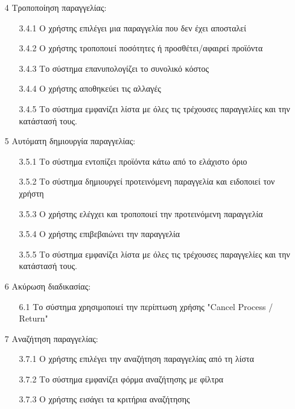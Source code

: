 \documentclass[12pt,a4paper,twoside]{book}
\begin{document}
\begin{enumerate}
\begin{enumerate}
        \end{enumerate}
  \item[4 ] Τροποποίηση παραγγελίας:
        \begin{enumerate}
          \item[3.4.1 ] Ο χρήστης επιλέγει μια παραγγελία που δεν έχει αποσταλεί %
          \item[3.4.2 ] Ο χρήστης τροποποιεί ποσότητες ή προσθέτει/αφαιρεί προϊόντα
          \item[3.4.3 ] Το σύστημα επανυπολογίζει το συνολικό κόστος
          \item[3.4.4 ] Ο χρήστης αποθηκεύει τις αλλαγές
          \item[3.4.5 ] Το σύστημα εμφανίζει λίστα με όλες τις τρέχουσες παραγγελίες και την κατάστασή τους.
        \end{enumerate}
  \item[5 ] Αυτόματη δημιουργία παραγγελίας: %
        \begin{enumerate}
          \item[3.5.1 ] Το σύστημα εντοπίζει προϊόντα κάτω από το ελάχιστο όριο
          \item[3.5.2 ] Το σύστημα δημιουργεί προτεινόμενη παραγγελία και ειδοποιεί τον χρήστη %
          \item[3.5.3 ] Ο χρήστης ελέγχει και τροποποιεί την προτεινόμενη παραγγελία
          \item[3.5.4 ] Ο χρήστης επιβεβαιώνει την παραγγελία
          \item[3.5.5 ] Το σύστημα εμφανίζει λίστα με όλες τις τρέχουσες παραγγελίες και την κατάστασή τους.
        \end{enumerate}
  \item[6 ] Ακύρωση διαδικασίας: %
        \begin{enumerate}
          \item[6.1 ] Το σύστημα χρησιμοποιεί την περίπτωση χρήσης "Cancel Process / Return" %
        \end{enumerate}
  \item[7 ] Αναζήτηση παραγγελίας:
        \begin{enumerate}
          \item[3.7.1 ] Ο χρήστης επιλέγει την αναζήτηση παραγγελίας από τη λίστα
          \item[3.7.2 ] Το σύστημα εμφανίζει φόρμα αναζήτησης με φίλτρα %
          \item[3.7.3 ] Ο χρήστης εισάγει τα κριτήρια αναζήτησης

\end{enumerate}
\end{enumerate}
\end{document}
